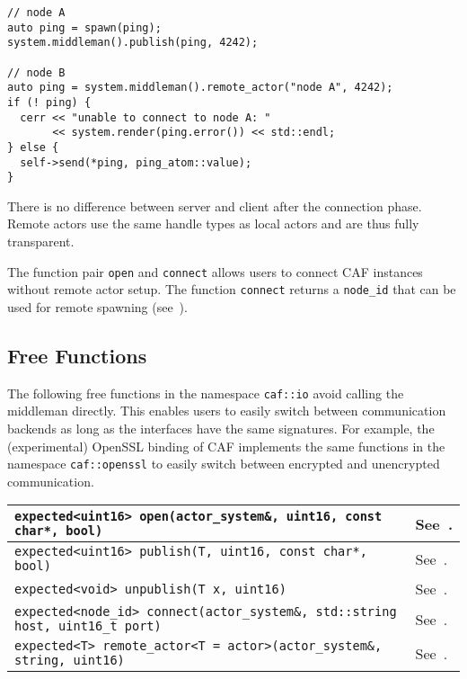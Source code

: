 \begin{lstlisting}
// node A
auto ping = spawn(ping);
system.middleman().publish(ping, 4242);

// node B
auto ping = system.middleman().remote_actor("node A", 4242);
if (! ping) {
  cerr << "unable to connect to node A: "
       << system.render(ping.error()) << std::endl;
} else {
  self->send(*ping, ping_atom::value);
}
\end{lstlisting}

There is no difference between server and client after the connection phase.
Remote actors use the same handle types as local actors and are thus fully
transparent.

The function pair \lstinline^open^ and \lstinline^connect^ allows users to
connect CAF instances without remote actor setup. The function
\lstinline^connect^ returns a \lstinline^node_id^ that can be used for remote
spawning (see~).

\subsection{Free Functions}
\label{free-remoting-functions}

The following free functions in the namespace \lstinline^caf::io^ avoid calling
the middleman directly. This enables users to easily switch between
communication backends as long as the interfaces have the same signatures. For
example, the (experimental) OpenSSL binding of CAF implements the same
functions in the namespace \lstinline^caf::openssl^ to easily switch between
encrypted and unencrypted communication.

\begin{center}
\begin{tabular}{ll}
  \hline
  \lstinline^expected<uint16> open(actor_system&, uint16, const char*, bool)^ & See~. \\
  \hline
  \lstinline^expected<uint16> publish(T, uint16, const char*, bool)^ & See~. \\
  \hline
  \lstinline^expected<void> unpublish(T x, uint16)^ & See~. \\
  \hline
  \lstinline^expected<node_id> connect(actor_system&, std::string host, uint16_t port)^ & See~. \\
  \hline
  \lstinline^expected<T> remote_actor<T = actor>(actor_system&, string, uint16)^ & See~. \\
  \hline
\end{tabular}
\end{center}

